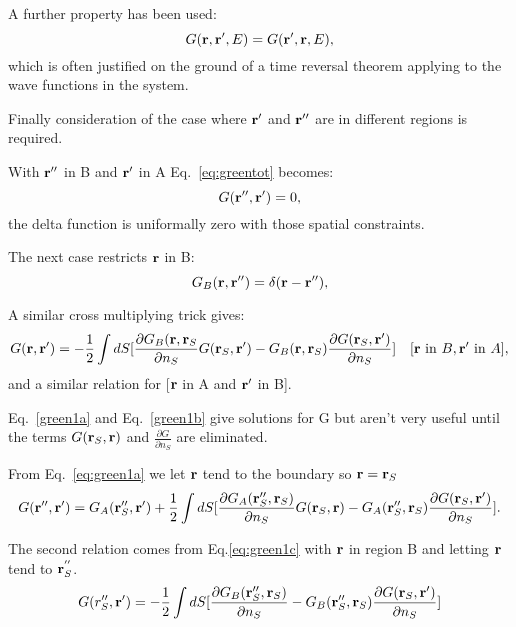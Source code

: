 A further property has been used:
%
\begin{equation}
G({\bf r},{\bf r}',E) = G({\bf r}',{\bf r},E),
\end{equation}
%
which is often justified on the ground of a time reversal theorem applying 
to the wave functions in the system.

Finally consideration of the case where ${\bf r}'$ and ${\bf r}''$ are in different regions is required.

With ${\bf r}''$ in B and ${\bf r}'$ in A Eq.~\ref{eq:greentot} becomes:
%
\begin{equation}
[-\frac{1}{2}\nabla^{2}_{\r''} + V(\r'') - E]G(\r'',\r') = 0,
\end{equation}
%
the delta function is uniformally zero with those spatial constraints.

The next case restricts ${\bf r}$ in B:
%
\begin{equation}
[-\frac{1}{2}\nabla^{2}_{\r''} + V(\r'') - E]G_B(\r,\r'')= \delta(\r-\r''),
\end{equation}
%

A similar cross multiplying trick gives:
%
\begin{equation}
\label{eq:green1c}
G({\bf r},{\bf r}') = -\frac{1}{2} \int dS[\frac{\partial G_{B}({\bf r}, {\bf r}_{S}}{\partial n_{S}} G({\bf r}_{S},{\bf r}')
- G_{B}({\bf r}, {\bf r}_{S})\frac{\partial G({\bf r}_{S},{\bf r}')}{\partial n_{S}}] \quad [{\bf r}~{\rm in}~B, {\bf r}'~{\rm in}~A],
\end{equation}
%
and a similar relation for [${\bf r}$ in A and ${\bf r}'$ in B].

Eq.~\ref{green1a} and Eq.~\ref{green1b} give solutions for G but 
aren't very useful until the terms $G({\bf r}_S,{\bf r})$ and 
$\frac{\partial G}{\partial n_{S}}$ are eliminated.

From Eq.~\ref{eq:green1a} we let ${\bf r}$ tend to the boundary so ${\bf r} = {\bf r}_{S}$
%
\begin{equation}
\label{eq:greensys1}
G({\bf r}'',{\bf r}') = G_{A}({\bf r}''_{S}, {\bf r}') + \frac{1}{2} \int d{S}
[\frac{\partial G_{A}({\bf r}''_{S}, {\bf r}_{S})}{\partial n_{S}} G({\bf r}_{S},{\bf r}) - 
G_{A}({\bf r}''_{S},{\bf r}_{S})\frac{\partial{G({\bf r}_{S}, {\bf r}')}}{\partial n_{S}}].
\end{equation}
%

The second relation comes from Eq.\ref{eq:green1c} with 
${\bf r}$ in region B and letting ${\bf r}$ tend to ${\bf r}^{''}_{S}$.
%
\begin{equation}
\label{eq:greensys2}
G(r''_{S}, {\bf r}') = -\frac{1}{2}\int dS [\frac{\partial G_{B}({\bf r}''_{S}, {\bf r}_{S})}{\partial n_{S}}
-G_{B}({\bf r}''_{S},{\bf r}_{S})\frac{\partial G({\bf r}_{S},{\bf r}')}{\partial n_{S}}]
\end{equation}
%

